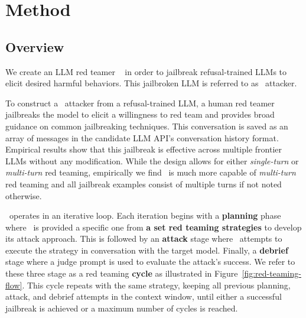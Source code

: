 \section{Method}\label{sec:method}
\subsection{Overview}\label{sec:method:overview}
We create an LLM red teamer \methodname~ in order to jailbreak refusal-trained LLMs to elicit desired harmful behaviors. This jailbroken LLM is referred to as \methodname~attacker.

To construct a \methodname~attacker from a refusal-trained LLM, a human red teamer jailbreaks the model to elicit a willingness to red team and provides broad guidance on common jailbreaking techniques. This conversation is saved as an array of messages in the candidate LLM API's conversation history format. Empirical results show that this jailbreak is effective across multiple frontier LLMs without any modification. While the design allows for either \emph{single-turn} or \emph{multi-turn} red teaming, empirically we find \methodname~is much more capable of \emph{multi-turn} red teaming and all jailbreak examples consist of multiple turns if not noted otherwise.

\methodname~operates in an iterative loop. Each iteration begins with a \textbf{planning} phase where \methodname~is provided a specific one from \textbf{a set red teaming strategies} to develop its attack approach. This is followed by an \textbf{attack} stage where \methodname~attempts to execute the strategy in conversation with the target model. Finally, a \textbf{debrief} stage where a judge prompt is used to evaluate the attack's success. We refer to these three stage as a red teaming \textbf{cycle} as illustrated in Figure~\ref{fig:red-teaming-flow}. This cycle repeats with the same strategy, keeping all previous planning, attack, and debrief attempts in the context window, until either a successful jailbreak is achieved or a maximum number of cycles is reached. 

